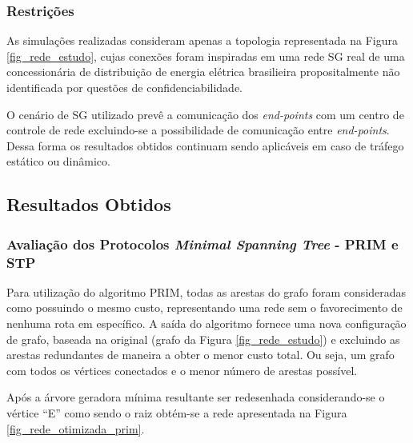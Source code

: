 \documentclass[12pt]{article}
\begin{document}
\subsubsection{Restrições}

As simulações realizadas consideram apenas a topologia representada na Figura \ref{fig_rede_estudo}, cujas conexões foram inspiradas em uma rede SG real de uma concessionária de distribuição de energia elétrica brasilieira propositalmente não identificada por questões de confidenciabilidade.

O cenário de SG utilizado prevê a comunicação dos \emph{end-points} com um centro de controle de rede excluindo-se a possibilidade de comunicação entre \emph{end-points}. Dessa forma os resultados obtidos continuam sendo aplicáveis em caso de tráfego estático ou dinâmico.

\subsection{Resultados Obtidos}
\label{sec:resultados}
\subsubsection{Avaliação dos Protocolos \emph{Minimal Spanning Tree} - PRIM e STP}
\label{sec:minimal_spanning_tree}
Para utilização do algoritmo PRIM, todas as arestas do grafo foram consideradas como possuindo o mesmo custo, representando uma rede sem o favorecimento de nenhuma rota em específico. A saída do algoritmo fornece uma nova configuração de grafo, baseada na original (grafo da Figura \ref{fig_rede_estudo}) e excluindo as arestas redundantes de maneira a obter o menor custo total. Ou seja, um grafo com todos os vértices conectados e o menor número de arestas possível.

Após a árvore geradora mínima resultante ser redesenhada considerando-se o vértice ``E'' como sendo o raiz obtém-se a rede apresentada na Figura \ref{fig_rede_otimizada_prim}.
\end{document}
